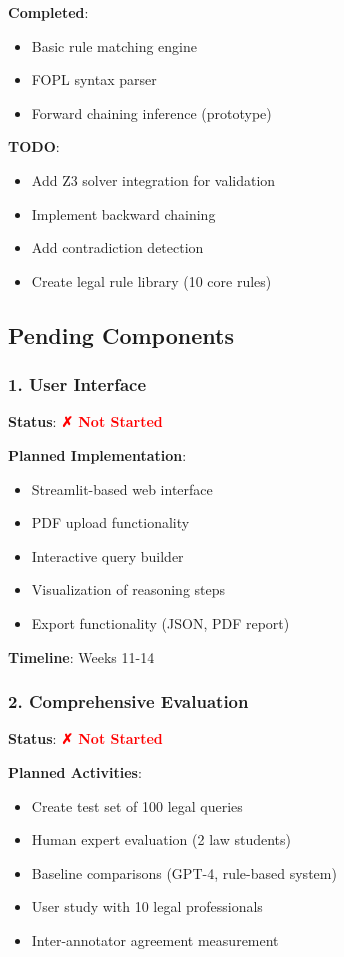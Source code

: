 \documentclass[12pt,a4paper]{article}
\begin{document}
\textbf{Completed}:
\begin{itemize}
    \item Basic rule matching engine
    \item FOPL syntax parser
    \item Forward chaining inference (prototype)
\end{itemize}

\textbf{TODO}:
\begin{itemize}
    \item Add Z3 solver integration for validation
    \item Implement backward chaining
    \item Add contradiction detection
    \item Create legal rule library (10 core rules)
\end{itemize}

\subsection{Pending Components}

\subsubsection{1. User Interface}

\textbf{Status}: \textcolor{red}{\textbf{✗ Not Started}}

\textbf{Planned Implementation}:
\begin{itemize}
    \item Streamlit-based web interface
    \item PDF upload functionality
    \item Interactive query builder
    \item Visualization of reasoning steps
    \item Export functionality (JSON, PDF report)
\end{itemize}

\textbf{Timeline}: Weeks 11-14

\subsubsection{2. Comprehensive Evaluation}

\textbf{Status}: \textcolor{red}{\textbf{✗ Not Started}}

\textbf{Planned Activities}:
\begin{itemize}
    \item Create test set of 100 legal queries
    \item Human expert evaluation (2 law students)
    \item Baseline comparisons (GPT-4, rule-based system)
    \item User study with 10 legal professionals
    \item Inter-annotator agreement measurement
\end{itemize}
\end{document}
